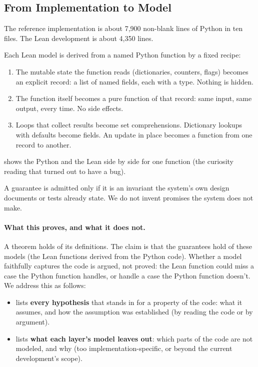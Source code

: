 \documentclass[11pt]{article}
\theoremstyle{remark}
\begin{document}
\subsection{From Implementation to Model}

The reference implementation is about 7{,}900 non-blank lines of Python in ten files. The
Lean development is about 4{,}350 lines.

Each Lean model is derived from a named Python function by a fixed recipe:

\begin{enumerate}[nosep]
    \item The mutable state the function reads (dictionaries, counters, flags) becomes an
    explicit record: a list of named fields, each with a type. Nothing is hidden.
    \item The function itself becomes a pure function of that record: same input, same
    output, every time. No side effects.
    \item Loops that collect results become set comprehensions. Dictionary lookups with
    defaults become fields. An update in place becomes a function from one record to
    another.
\end{enumerate}

 shows the Python and the Lean side by side for one function (the
curiosity reading that turned out to have a bug).

A guarantee is admitted only if it is an invariant the system's own design documents or
tests already state. We do not invent promises the system does not make.

\paragraph{What this proves, and what it does not.} A theorem holds of its definitions.
The claim is that the guarantees hold of these models (the Lean functions derived from the
Python code). Whether a model faithfully captures the code is argued, not proved: the Lean
function could miss a case the Python function handles, or handle a case the Python
function doesn't. We address this as follows:

\begin{itemize}[nosep]
    \item {} lists \textbf{every hypothesis} that stands in for a
    property of the code: what it assumes, and how the assumption was established (by
    reading the code or by argument).
    \item {} lists \textbf{what each layer's model leaves out}: which
    parts of the code are not modeled, and why (too implementation-specific, or beyond the
    current development's scope).
\end{itemize}
\end{document}
